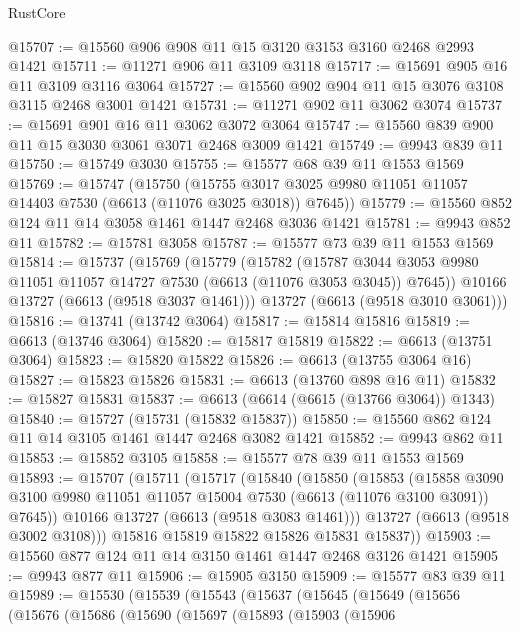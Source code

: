 \begin{lexlean}{RustCore}
\begin{coremodule}
@15707 := @15560 @906 @908 @11 @15 @3120 @3153 @3160 @2468 @2993 @1421
@15711 := @11271 @906 @11 @3109 @3118
@15717 := @15691 @905 @16 @11 @3109 @3116 @3064
@15727 := @15560 @902 @904 @11 @15 @3076 @3108 @3115 @2468 @3001 @1421
@15731 := @11271 @902 @11 @3062 @3074
@15737 := @15691 @901 @16 @11 @3062 @3072 @3064
@15747 := @15560 @839 @900 @11 @15 @3030 @3061 @3071 @2468 @3009 @1421
@15749 := @9943 @839 @11
@15750 := @15749 @3030
@15755 := @15577 @68 @39 @11 @1553 @1569
@15769 := @15747
    (@15750
      (@15755 @3017 @3025 @9980 @11051 @11057 @14403 @7530 (@6613 (@11076 @3025 @3018)) @7645))
@15779 := @15560 @852 @124 @11 @14 @3058 @1461 @1447 @2468 @3036 @1421
@15781 := @9943 @852 @11
@15782 := @15781 @3058
@15787 := @15577 @73 @39 @11 @1553 @1569
@15814 := @15737
    (@15769
      (@15779
        (@15782
          (@15787 @3044 @3053 @9980 @11051 @11057 @14727 @7530 (@6613 (@11076 @3053 @3045)) @7645))
        @10166
        @13727
        (@6613 (@9518 @3037 @1461)))
      @13727
      (@6613 (@9518 @3010 @3061)))
@15816 := @13741 (@13742 @3064)
@15817 := @15814 @15816
@15819 := @6613 (@13746 @3064)
@15820 := @15817 @15819
@15822 := @6613 (@13751 @3064)
@15823 := @15820 @15822
@15826 := @6613 (@13755 @3064 @16)
@15827 := @15823 @15826
@15831 := @6613 (@13760 @898 @16 @11)
@15832 := @15827 @15831
@15837 := @6613 (@6614 (@6615 (@13766 @3064)) @1343)
@15840 := @15727 (@15731 (@15832 @15837))
@15850 := @15560 @862 @124 @11 @14 @3105 @1461 @1447 @2468 @3082 @1421
@15852 := @9943 @862 @11
@15853 := @15852 @3105
@15858 := @15577 @78 @39 @11 @1553 @1569
@15893 := @15707
    (@15711
      (@15717
        (@15840
          (@15850
            (@15853
              (@15858
                @3090
                @3100
                @9980
                @11051
                @11057
                @15004
                @7530
                (@6613 (@11076 @3100 @3091))
                @7645))
            @10166
            @13727
            (@6613 (@9518 @3083 @1461)))
          @13727
          (@6613 (@9518 @3002 @3108)))
        @15816
        @15819
        @15822
        @15826
        @15831
        @15837))
@15903 := @15560 @877 @124 @11 @14 @3150 @1461 @1447 @2468 @3126 @1421
@15905 := @9943 @877 @11
@15906 := @15905 @3150
@15909 := @15577 @83 @39 @11
@15989 := @15530
    (@15539
      (@15543
        (@15637
          (@15645
            (@15649
              (@15656
                (@15676
                  (@15686
                    (@15690
                      (@15697
                        (@15893
                          (@15903
                            (@15906

\end{coremodule}
\end{lexlean}
